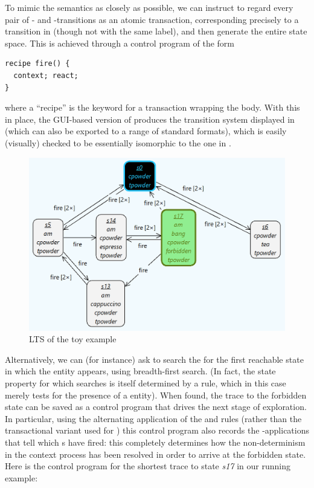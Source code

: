To mimic the \BioResolve semantics as closely as possible, we can instruct \GROOVE to regard every pair of \contextR- and \reactR-transitions as an atomic transaction, corresponding precisely to a transition in \BioResolve (though not with the same label), and then generate the entire state space. This is achieved through a control program of the form
%
\begin{lstlisting}[keywordstyle=\bfseries,morekeywords={recipe}]
recipe fire() {
  context; react;
}
\end{lstlisting}
%
where a ``recipe'' is the keyword for a transaction wrapping the body. With this in place, the GUI-based version of \GROOVE produces the transition system displayed in  (which can also be exported to a range of standard formats), which is easily (visually) checked to be essentially isomorphic to the one in .

\begin{figure}
\centering
\includegraphics[scale=.2]{figs/toy-gts}
\caption{\GROOVE LTS of the toy example}
\label{fig:toy-gts}
\end{figure}

Alternatively, we can (for instance) ask \GROOVE to search the for the first reachable state in which the \Forbidden entity appears, using breadth-first search. (In fact, the state property for which \GROOVE searches is itself determined by a rule, which in this case merely tests for the presence of a \Forbidden entity). When found, the trace to the forbidden state can be saved as a control program that drives the next stage of \GROOVE exploration. In particular, using the alternating application of the \contextR and \reactR rules (rather than the transactional variant used for ) this control program also records the \firedR-applications that tell which \Step{}s have fired: this completely determines how the non-determinism in the context process has been resolved in order to arrive at the forbidden state. Here is the control program for the shortest trace to state \textsf{\itshape s17} in our running example:

